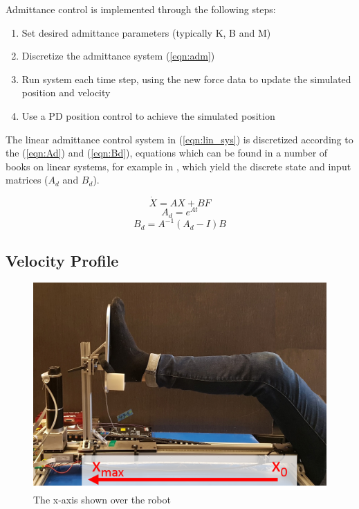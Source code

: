 \documentclass[12pt]{report}
\begin{document}
Admittance control is implemented through the following steps: 

	\begin{enumerate}
		\item Set desired admittance parameters (typically K, B and M)
		\item Discretize the admittance system (\ref{eqn:adm})
		\item Run system each time step, using the new force data to update the simulated position and velocity 
		\item Use a PD position control to achieve the simulated position
	\end{enumerate}
	
	The linear admittance control system in (\ref{eqn:lin_sys}) is discretized according to the (\ref{eqn:Ad}) and (\ref{eqn:Bd}), equations which can be found in a number of books on linear systems, for example in \cite{Evans2005}, which yield the discrete state and input matrices ($A_d$ and $B_d$).
	
	\begin{equation} \label{eqn:lin_sys} 
	\dot{X} = AX + BF
	\end{equation}
	\begin{equation} \label{eqn:Ad} 
	A_d = e^{At} 
	\end{equation}
	\begin{equation} \label{eqn:Bd} 
	B_d = A^{-1}(A_d - I)B
	\end{equation}
	
	\subsection{Velocity Profile}	
	
		\begin{figure}[h] 
		\centering
		\includegraphics[width=0.6\linewidth]{axis}
		\caption{The x-axis shown over the robot}
		\label{fig:axis}
	\end{figure}
	
\end{document}
